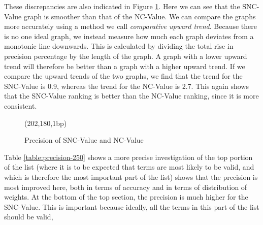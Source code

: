 These discrepancies are also indicated in Figure
\ref{fig:precision-10}. Here we can see that the SNC-Value graph is smoother than that of the NC-Value. We can compare the graphs more
accurately using a method we call {\it comparative upward trend}. 
Because there is no one ideal graph, we instead measure how much each
graph deviates from a monotonic line downwards. This is
calculated by dividing the total rise in precision percentage by the
length of the graph. A graph with a lower upward trend will therefore be better
than a graph with a higher upward trend. If we compare the upward trends of
the two graphs, we find that the trend for the SNC-Value is 0.9,
whereas the trend for the NC-Value is 2.7. This again shows that the
SNC-Value ranking is better than the NC-Value ranking, since it is
more consistent.

\begin{figure}
\begin{center}
\begin{epsf}
\end{epsf}
\begin{draft}
\atari(202,180,1bp)
\end{draft}
\end{center}
\caption{Precision of SNC-Value and NC-Value}
\label{fig:precision-10}
\end{figure}

Table \ref{table:precision-250} shows a more precise investigation of the top portion of the list (where it is
to be expected that terms are most likely to be valid, and which is
therefore the most important part of the list) shows that the
precision is most improved here, both in terms of accuracy and in
terms of distribution of weights. At the bottom of the top section, the
precision is much higher for the SNC-Value. This is important because
ideally, all the terms in this part of the list should be valid,

